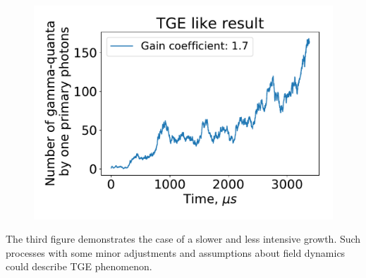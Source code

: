 \documentclass[8pt,pdf,hyperref={unicode}]{beamer}
\begin{document}
\begin{frame}
    \frametitle{}
    
    \begin{columns}
    	
    	\begin{column}{0.5\textwidth}
    		
    		\begin{figure}[htb]
    			\centering
    			\includegraphics[width=1\columnwidth]{proofTGE.pdf}
    		\end{figure}
    		The third figure demonstrates the case of a slower and less intensive growth. Such processes with some minor adjustments and assumptions about field dynamics could describe TGE phenomenon.	
    	\end{column}
    \end{columns}

\end{frame}
\end{document}
